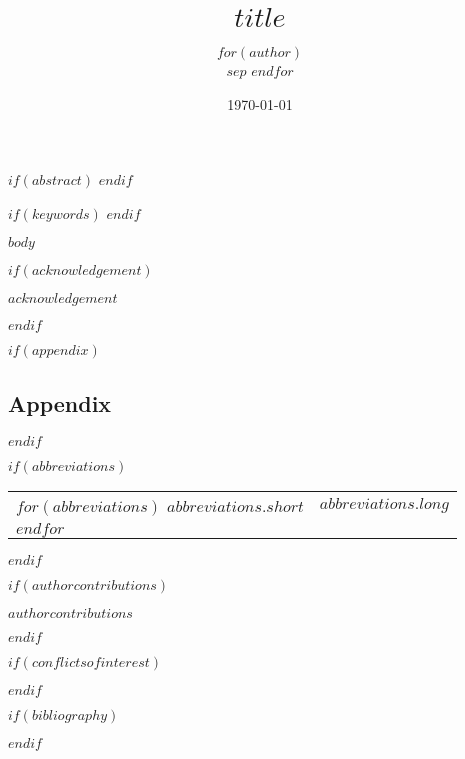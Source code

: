 \documentclass[11pt,halfline,a4paper]{oupnice}
\title{$title$}
\author{$for(author)$%
\name{$author.name$}
\address{$author.affiliation$}%
$sep$ $endfor$}
\begin{document}




\date{\today}

$if(abstract)$
$endif$

$if(keywords)$
$endif$



\maketitle

$body$

$if(acknowledgement)$
\begin{notes}[Acknowledgements]
$acknowledgement$
\end{notes}
$endif$


$if(appendix)$
\subsection{Appendix}

$endif$

$if(abbreviations)$
\begin{notes}[Abbreviations]
\noindent
\begin{tabular}{@{}ll}
$for(abbreviations)$
$abbreviations.short$ & $abbreviations.long$ \\
$endfor$
\end{tabular}
\end{notes}
$endif$


$if(authorcontributions)$
\begin{notes}
$authorcontributions$
\end{notes}
$endif$

$if(conflictsofinterest)$
\begin{notes}
\end{notes}
$endif$

$if(bibliography)$

$endif$
\end{document}
